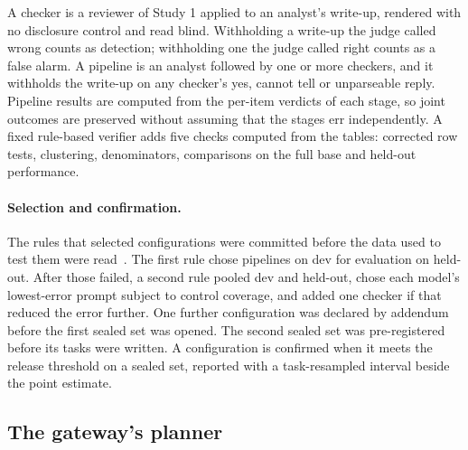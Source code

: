 A checker is a reviewer of Study 1 applied to an analyst's write-up, rendered with no disclosure control and read blind. Withholding a write-up the judge called wrong counts as detection; withholding one the judge called right counts as a false alarm. A pipeline is an analyst followed by one or more checkers, and it withholds the write-up on any checker's yes, cannot tell or unparseable reply. Pipeline results are computed from the per-item verdicts of each stage, so joint outcomes are preserved without assuming that the stages err independently. A fixed rule-based verifier adds five checks computed from the tables: corrected row tests, clustering, denominators, comparisons on the full base and held-out performance.

\paragraph{Selection and confirmation.}
The rules that selected configurations were committed before the data used to test them were read~\cite{nosek2018prereg}. The first rule chose pipelines on dev for evaluation on held-out. After those failed, a second rule pooled dev and held-out, chose each model's lowest-error prompt subject to control coverage, and added one checker if that reduced the error further. One further configuration was declared by addendum before the first sealed set was opened. The second sealed set was pre-registered before its tasks were written. A configuration is confirmed when it meets the release threshold on a sealed set, reported with a task-resampled interval beside the point estimate.

\subsection{The gateway's planner}
\label{sec:methods-planner}

